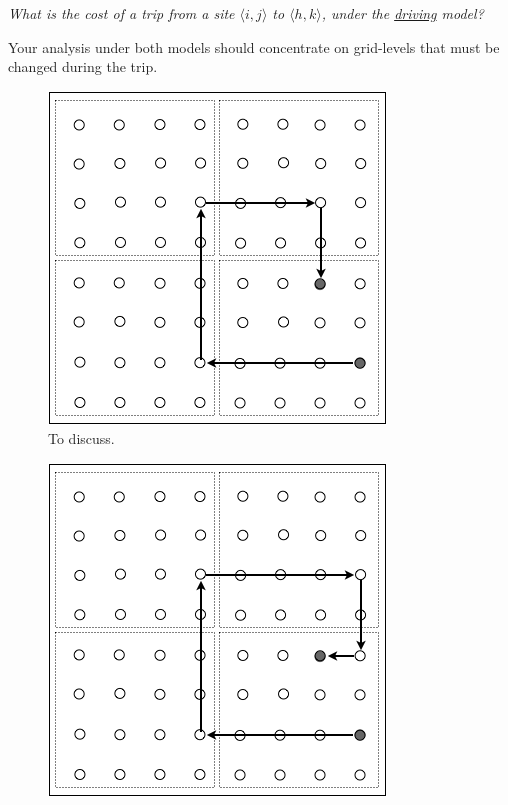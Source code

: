 \begin{enumerate}
{\begin{enumerate}
 \smallskip

{\em What is the cost of a trip from a site $\langle i,j \rangle$ to $\langle h,k \rangle$, under the \underline{driving} model?}

\smallskip

Your analysis under both models should concentrate on grid-levels that must be changed during the trip.
 \end{enumerate}

 \begin{figure}[hbt]
\begin{center}
       \includegraphics[scale=0.5]{FiguresGraph/routingCitySolution1}
       \caption{To discuss.}
  \label{fig:routingCity}
\end{center}
\end{figure}
 \begin{figure}[hbt]
\begin{center}
       \includegraphics[scale=0.5]{FiguresGraph/routingCity2}

\end{center}
\end{figure}}
\end{enumerate}
